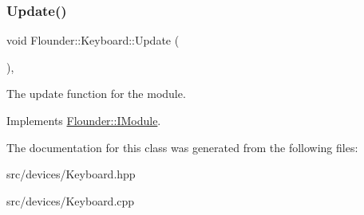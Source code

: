 \subsubsection{\texorpdfstring{Update()}{Update()}}
{\footnotesize\ttfamily void Flounder\+::\+Keyboard\+::\+Update (\begin{DoxyParamCaption}{ }\end{DoxyParamCaption})\hspace{0.3cm}{\ttfamily [override]}, {\ttfamily [virtual]}}



The update function for the module. 



Implements \hyperlink{class_flounder_1_1_i_module_a1812bb03a6990e4698a10c043fa25fde}{Flounder\+::\+I\+Module}.



The documentation for this class was generated from the following files\+:\begin{DoxyCompactItemize}
\item 
src/devices/Keyboard.\+hpp\item 
src/devices/Keyboard.\+cpp\end{DoxyCompactItemize}
